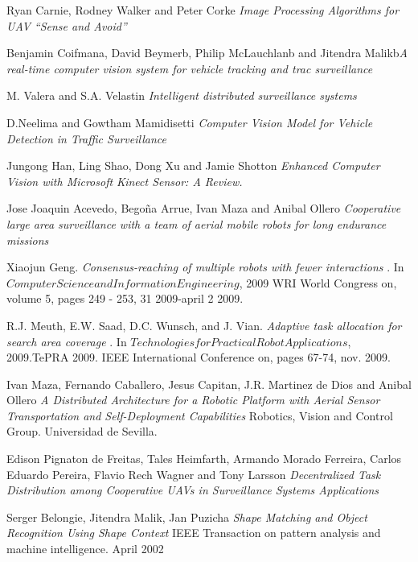 \documentclass[11pt, oneside]{book} %
\begin{document}
\begin{thebibliography}{9}

 Ryan Carnie, Rodney Walker and Peter Corke \textit{Image Processing Algorithms for UAV “Sense and Avoid”} 

 Benjamin Coifmana, David Beymerb, Philip McLauchlanb and Jitendra Malikb\textit{A real-time computer vision system for vehicle tracking and trac surveillance} 

 M. Valera and S.A. Velastin \textit{Intelligent distributed surveillance systems} 

 D.Neelima and Gowtham Mamidisetti \textit{Computer Vision Model for Vehicle Detection in Traffic Surveillance} 

 Jungong Han, Ling Shao, Dong Xu and Jamie Shotton \textit{Enhanced Computer Vision with Microsoft Kinect Sensor: A Review.} 

 Jose Joaquin Acevedo, Bego\~na Arrue, Ivan Maza and Anibal Ollero \textit{Cooperative large area surveillance with a team of aerial mobile robots for long endurance missions}


 Xiaojun Geng. \textit{ Consensus-reaching of multiple robots with fewer interactions }. In $Computer Science and Information Engineering$, 2009 WRI World Congress on, volume 5, pages 249 - 253, 31 2009-april 2 2009.

 R.J. Meuth, E.W. Saad, D.C. Wunsch, and J. Vian. \textit{Adaptive task allocation for search area coverage} . In $Technologies for Practical Robot Applications$, 2009.TePRA 2009. IEEE International Conference on, pages 67-74, nov. 2009.

 Ivan Maza, Fernando Caballero, Jesus Capitan, J.R. Martinez de Dios and Anibal Ollero \textit{A Distributed Architecture for a Robotic Platform with Aerial Sensor Transportation and Self-Deployment Capabilities} Robotics, Vision and Control Group. Universidad de Sevilla.

 Edison Pignaton de Freitas, Tales Heimfarth, Armando Morado Ferreira, Carlos Eduardo Pereira, Flavio Rech Wagner and Tony Larsson \textit{Decentralized Task Distribution among Cooperative UAVs in Surveillance Systems Applications}

 Serger Belongie, Jitendra Malik, Jan Puzicha \textit{Shape Matching and Object Recognition Using Shape Context} IEEE Transaction on pattern analysis and machine intelligence. April 2002


\end{thebibliography}
\end{document}
